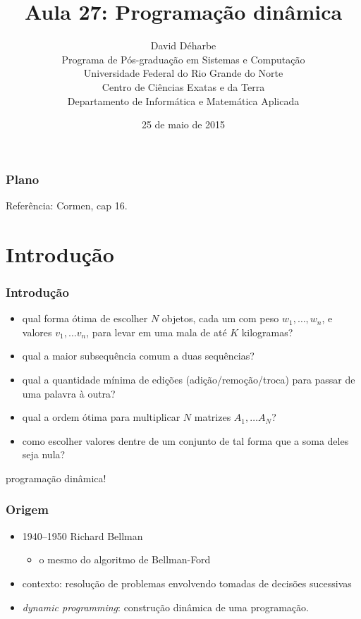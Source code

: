 \documentclass{beamer}
\title{Aula 27: Programação dinâmica}
\author{David Déharbe \\
  Programa de Pós-graduação em Sistemas e Computação \\
  Universidade Federal do Rio Grande do Norte \\
  Centro de Ciências Exatas e da Terra \\
  Departamento de Informática e Matemática Aplicada}
\date{25 de maio de 2015}
\begin{document}


\begin{frame}
  \titlepage
\end{frame}

\begin{frame}
  \frametitle{Plano}

  \tableofcontents
Referência: Cormen, cap 16.
\end{frame}

\section{Introdução}


\begin{frame}
\frametitle{Introdução}

\begin{itemize}
\item qual forma ótima de escolher $N$ objetos, cada um com peso $w_1, \ldots,
  w_n$, e valores $v_1, \ldots v_n$, para levar em uma mala de até $K$
  kilogramas?
\item qual a maior subsequência comum a duas sequências?
\item qual a quantidade mínima de edições (adição/remoção/troca) para passar de uma palavra à outra?
\item qual a ordem ótima para multiplicar $N$ matrizes $A_1, \ldots A_N$?
\item como escolher valores dentre de um conjunto de tal forma que a soma deles seja nula?
\end{itemize}
\pause
\alert{programação dinâmica!}

\end{frame}


\begin{frame}
\frametitle{Origem}

\begin{itemize}
\item 1940--1950 Richard Bellman
\begin{itemize}
\item o mesmo do algoritmo de Bellman-Ford
\end{itemize}
\item contexto: resolução de problemas envolvendo tomadas de decisões sucessivas
\item \textit{dynamic programming}: construção dinâmica de uma programação.
\end{itemize}

\end{frame}
\end{document}
